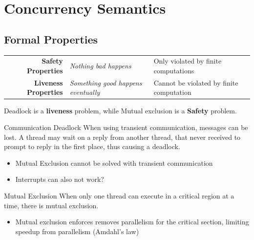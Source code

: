 \chapter{Concurrency Semantics}

\section{Formal Properties}
\begin{center}
    \begin{tabular}{r l l}
        \textbf{Safety Properties} & \textit{Nothing bad happens} & Only violated by finite computations \\
        \textbf{Liveness Properties} & \textit{Something good happens eventually} & Cannot be violated by finite computation \\
    \end{tabular}
\end{center}
Deadlock is a \textbf{liveness} problem, while Mutual exclusion is a \textbf{Safety} problem.

\begin{definitionbox}{Communication Deadlock}
    When using transient communication, messages can be lost. 
    A thread may wait on a reply from another thread, that never 
    received to prompt to reply in the first place, thus causing a deadlock.
\end{definitionbox}

\begin{itemize}
    \item Mutual Exclusion cannot be solved with transient communication
    \item Interrupts can also not work?
\end{itemize}

\begin{definitionbox}{Mutual Exclusion}
    When only one thread can execute in a critical region at a time, there is mutual exclusion.
    \begin{itemize}
        \item Mutual exclusion enforces removes parallelism for the critical section, limiting speedup from parallelism (Amdahl's law)
    \end{itemize}
\end{definitionbox}

